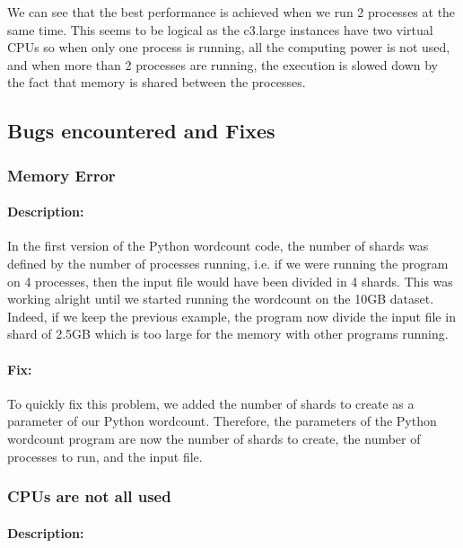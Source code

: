 \documentclass{article}
\begin{document}
We can see that the best performance is achieved when we run 2 processes at the same time. This seems to be logical as the c3.large instances have two virtual CPUs so when only one process is running, all the computing power is not used, and when more than 2 processes are running, the execution is slowed down by the fact that memory is shared between the processes.

\subsection{Bugs encountered and Fixes}

\subsubsection*{Memory Error}

\paragraph{Description: }

In the first version of the Python wordcount code, the number of shards was defined by the number of processes running, i.e. if we were running the program on 4 processes, then the input file would have been divided in 4 shards.
This was working alright until we started running the wordcount on the 10GB dataset. Indeed, if we keep the previous example, the program now divide the input file in shard of 2.5GB which is too large for the memory with other programs running.

\paragraph{Fix: }

To quickly fix this problem, we added the number of shards to create as a parameter of our Python wordcount. Therefore, the parameters of the Python wordcount program are now the number of shards to create, the number of processes to run, and the input file.

\subsubsection*{CPUs are not all used}

\paragraph{Description: }
\end{document}
